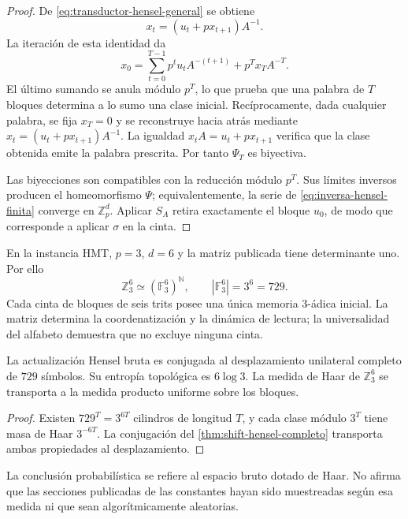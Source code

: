 \begin{proof}
De \cref{eq:transductor-hensel-general} se obtiene
\[
 x_t=(u_t+px_{t+1})A^{-1}.
\]
La iteración de esta identidad da
\[
 x_0=
 \sum_{t=0}^{T-1}p^t u_tA^{-(t+1)}
 +p^Tx_TA^{-T}.
\]
El último sumando se anula módulo \(p^T\), lo que prueba que una palabra de
\(T\) bloques determina a lo sumo una clase inicial. Recíprocamente, dada
cualquier palabra, se fija \(x_T=0\) y se reconstruye hacia atrás mediante
\(x_t=(u_t+px_{t+1})A^{-1}\). La igualdad
\(x_tA=u_t+px_{t+1}\) verifica que la clase obtenida emite la palabra
prescrita. Por tanto \(\Psi_T\) es biyectiva.

Las biyecciones son compatibles con la reducción módulo \(p^T\). Sus límites
inversos producen el homeomorfismo \(\Psi\); equivalentemente, la serie de
\cref{eq:inversa-hensel-finita} converge en \(\mathbb Z_p^d\). Aplicar
\(S_A\) retira exactamente el bloque \(u_0\), de modo que corresponde a
aplicar \(\sigma\) en la cinta.
\end{proof}

En la instancia HMT, \(p=3\), \(d=6\) y la matriz publicada tiene
determinante uno. Por ello
\begin{equation}
 \mathbb Z_3^6\simeq(\mathbb F_3^6)^{\mathbb N},
 \qquad |\mathbb F_3^6|=3^6=729.
 \label{eq:hmt-shift-729}
\end{equation}
Cada cinta de bloques de seis trits posee una única memoria 3-ádica inicial.
La matriz determina la coordenatización y la dinámica de lectura; la
universalidad del alfabeto demuestra que no excluye ninguna cinta.

\begin{corollary}
La actualización Hensel bruta es conjugada al desplazamiento unilateral
completo de
\(729\) símbolos. Su entropía topológica es \(6\log3\). La medida de Haar de
\(\mathbb Z_3^6\) se transporta a la medida producto uniforme sobre los
bloques.
\end{corollary}

\begin{proof}
Existen \(729^T=3^{6T}\) cilindros de longitud \(T\), y cada clase módulo
\(3^T\) tiene masa de Haar \(3^{-6T}\). La conjugación del
\cref{thm:shift-hensel-completo} transporta ambas propiedades al
desplazamiento.
\end{proof}

La conclusión probabilística se refiere al espacio bruto dotado de Haar. No
afirma que las secciones publicadas de las constantes hayan sido muestreadas
según esa medida ni que sean algorítmicamente aleatorias.

